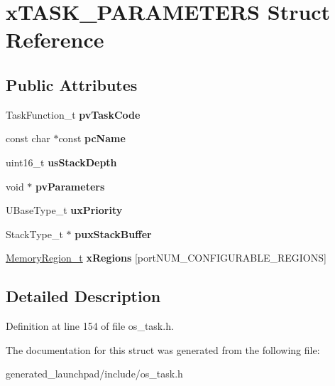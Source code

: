 \hypertarget{structxTASK__PARAMETERS}{}\section{x\+T\+A\+S\+K\+\_\+\+P\+A\+R\+A\+M\+E\+T\+E\+RS Struct Reference}
\label{structxTASK__PARAMETERS}
\subsection*{Public Attributes}
\begin{DoxyCompactItemize}
\item 
\mbox{\label{structxTASK__PARAMETERS_a7527993402054565cda38251c8922880}} 
Task\+Function\+\_\+t {\bfseries pv\+Task\+Code}
\item 
\mbox{\label{structxTASK__PARAMETERS_a7b3e5583acf9de8bacac572a42246459}} 
const char $\ast$const {\bfseries pc\+Name}
\item 
\mbox{\label{structxTASK__PARAMETERS_aa07bfb2214d78ba7a30592fa7b75af18}} 
uint16\+\_\+t {\bfseries us\+Stack\+Depth}
\item 
\mbox{\label{structxTASK__PARAMETERS_accbb9f4de75b5b5be750198b52390c7f}} 
void $\ast$ {\bfseries pv\+Parameters}
\item 
\mbox{\label{structxTASK__PARAMETERS_aa1aff14035db645e2bdcc85b3cdc9bab}} 
U\+Base\+Type\+\_\+t {\bfseries ux\+Priority}
\item 
\mbox{\label{structxTASK__PARAMETERS_a946c525d3765369780538f9bc3f3586d}} 
Stack\+Type\+\_\+t $\ast$ {\bfseries pux\+Stack\+Buffer}
\item 
\mbox{\label{structxTASK__PARAMETERS_ae8b97c6b7a344bf09b066b0844844d66}} 
\mbox{\hyperlink{structxMEMORY__REGION}{Memory\+Region\+\_\+t}} {\bfseries x\+Regions} \mbox{[}port\+N\+U\+M\+\_\+\+C\+O\+N\+F\+I\+G\+U\+R\+A\+B\+L\+E\+\_\+\+R\+E\+G\+I\+O\+NS\mbox{]}
\end{DoxyCompactItemize}


\subsection{Detailed Description}


Definition at line 154 of file os\+\_\+task.\+h.



The documentation for this struct was generated from the following file\+:\begin{DoxyCompactItemize}
\item 
generated\+\_\+launchpad/include/os\+\_\+task.\+h\end{DoxyCompactItemize}
